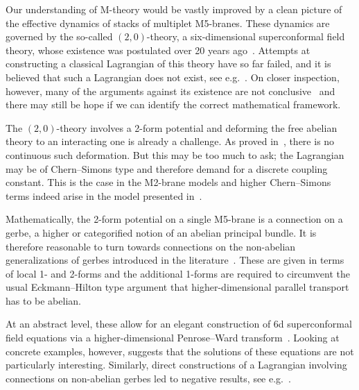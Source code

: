\documentclass[reqno,a4paper,11pt]{article}
\begin{document}
Our understanding of M-theory would be vastly improved by a clean picture of the effective dynamics of stacks of multiplet M5-branes. These dynamics are governed by the so-called $(2,0)$-theory, a six-dimensional superconformal field theory, whose existence was postulated over 20 years ago~\cite{Witten:1995zh}. Attempts at constructing a classical Lagrangian of this theory have so far failed, and it is believed that such a Lagrangian does not exist, see e.g.~\cite{Witten:2007ct}. On closer inspection, however, many of the arguments against its existence are not conclusive~\cite{Saemann:2017zpd} and there may still be hope if we can identify the correct mathematical framework.

The $(2,0)$-theory involves a 2-form potential and deforming the free abelian theory to an interacting one is already a challenge. As proved in~\cite{Bekaert:9909094,Bekaert:2000qx}, there is no continuous such deformation. But this may be too much to ask; the Lagrangian may be of Chern--Simons type and therefore demand for a discrete coupling constant. This is the case in the M2-brane models and higher Chern--Simons terms indeed arise in the model presented in~\cite{Saemann:2017zpd}. 

Mathematically, the 2-form potential on a single M5-brane is a connection on a gerbe, a higher or categorified notion of an abelian principal bundle. It is therefore reasonable to turn towards connections on the non-abelian generalizations of gerbes introduced in the literature~\cite{Breen:math0106083,Aschieri:2003mw}. These are given in terms of local 1- and 2-forms and the additional 1-forms are required to circumvent the usual Eckmann--Hilton type argument that higher-dimensional parallel transport has to be abelian. 

At an abstract level, these allow for an elegant construction of 6d superconformal field equations via a higher-dimensional Penrose--Ward transform~\cite{Saemann:2012uq,Saemann:2013pca,Jurco:2014mva,Jurco:2016qwv}. Looking at concrete examples, however, suggests that the solutions of these equations are not particularly interesting. Similarly, direct constructions of a Lagrangian involving connections on non-abelian gerbes led to negative results, see e.g.~\cite{Ho:2012nt}.
\end{document}
